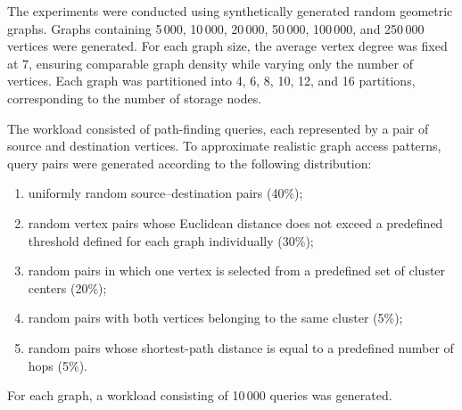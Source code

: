 The experiments were conducted using synthetically generated random geometric graphs. Graphs containing 5\,000, 10\,000, 20\,000, 50\,000, 100\,000, and 250\,000 vertices were generated. For each graph size, the average vertex degree was fixed at 7, ensuring comparable graph density while varying only the number of vertices. Each graph was partitioned into 4, 6, 8, 10, 12, and 16 partitions, corresponding to the number of storage nodes.

The workload consisted of path-finding queries, each represented by a pair of source and destination vertices. To approximate realistic graph access patterns, query pairs were generated according to the following distribution:

\begin{enumerate}
\item uniformly random source--destination pairs (40\%);
\item random vertex pairs whose Euclidean distance does not exceed a predefined threshold defined for each graph individually (30\%);
\item random pairs in which one vertex is selected from a predefined set of cluster centers (20\%);
\item random pairs with both vertices belonging to the same cluster (5\%);
\item random pairs whose shortest-path distance is equal to a predefined number of hops (5\%).
\end{enumerate}

For each graph, a workload consisting of 10\,000 queries was generated.
